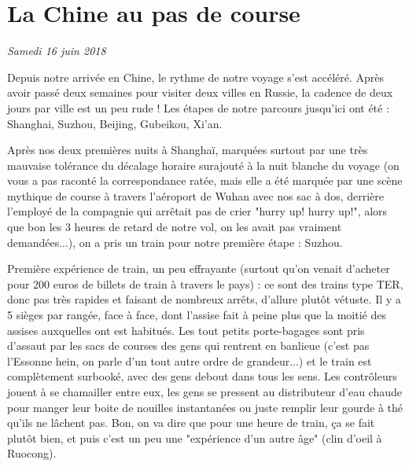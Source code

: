 \hypertarget{la-chine-au-pas-de-course}{%
\section{La Chine au pas de course}\label{la-chine-au-pas-de-course}}

\emph{Samedi 16 juin 2018}

Depuis notre arrivée en Chine, le rythme de notre voyage s'est accéléré.
Après avoir passé deux semaines pour visiter deux villes en Russie, la
cadence de deux jours par ville est un peu rude ! Les étapes de notre
parcours jusqu'ici ont été : Shanghai, Suzhou, Beijing, Gubeikou, Xi'an.

Après nos deux premières nuits à Shanghaï, marquées surtout par une très
mauvaise tolérance du décalage horaire surajouté à la nuit blanche du
voyage (on vous a pas raconté la correspondance ratée, mais elle a été
marquée par une scène mythique de course à travers l'aéroport de Wuhan
avec nos sac à dos, derrière l'employé de la compagnie qui arrêtait pas
de crier "hurry up! hurry up!", alors que bon les 3 heures de retard de
notre vol, on les avait pas vraiment demandées...), on a pris un train
pour notre première étape : Suzhou.

Première expérience de train, un peu effrayante (surtout qu'on venait
d'acheter pour 200 euros de billets de train à travers le pays) : ce
sont des trains type TER, donc pas très rapides et faisant de nombreux
arrêts, d'allure plutôt vétuste. Il y a 5 sièges par rangée, face à
face, dont l'assise fait à peine plus que la moitié des assises
auxquelles ont est habitués. Les tout petits porte-bagages sont pris
d'assaut par les sacs de courses des gens qui rentrent en banlieue
(c'est pas l'Essonne hein, on parle d'un tout autre ordre de
grandeur...) et le train est complètement surbooké, avec des gens debout
dans tous les sens. Les contrôleurs jouent à se chamailler entre eux,
les gens se pressent au distributeur d'eau chaude pour manger leur boite
de nouilles instantanées ou juste remplir leur gourde à thé qu'ils ne
lâchent pas. Bon, on va dire que pour une heure de train, ça se fait
plutôt bien, et puis c'est un peu une "expérience d'un autre âge" (clin
d'oeil à Ruocong).


